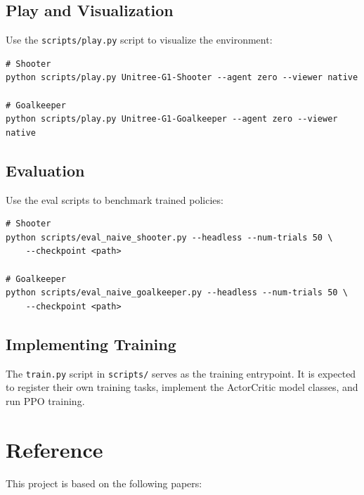 \documentclass{article}
\begin{document}
\subsection{Play and Visualization}

Use the \texttt{scripts/play.py} script to visualize the environment:

\begin{verbatim}
# Shooter
python scripts/play.py Unitree-G1-Shooter --agent zero --viewer native

# Goalkeeper
python scripts/play.py Unitree-G1-Goalkeeper --agent zero --viewer native
\end{verbatim}

\subsection{Evaluation}

Use the eval scripts to benchmark trained policies:

\begin{verbatim}
# Shooter
python scripts/eval_naive_shooter.py --headless --num-trials 50 \
    --checkpoint <path>

# Goalkeeper
python scripts/eval_naive_goalkeeper.py --headless --num-trials 50 \
    --checkpoint <path>
\end{verbatim}

\subsection{Implementing Training}

The \texttt{train.py} script in \texttt{scripts/} serves as the training entrypoint. It is expected to register their own training tasks, implement the ActorCritic model classes, and run PPO training.

\section{Reference}

This project is based on the following papers:



\end{document}
